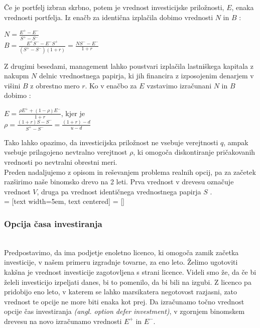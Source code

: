 Če je portfelj izbran skrbno, potem je vrednost investicijske priložnosti, $E$, enaka vrednosti portfelja. Iz enačb za identična izplačila dobimo vrednosti $N$ in $B$ \cite[str. 156]{Trigeorgis}:
\begin{center}
$N = \tfrac{E^+ - E^-}{S^+ - S^-}$\\[0,5 cm]
$B = \tfrac{E^+S^- - E^-S^+}{(S^+ - S^-)(1+r)} = \tfrac{NS^- - E^-}{1+r}$\\
\end{center}
Z drugimi besedami, management lahko poustvari izplačila lastniškega kapitala z nakupm $N$ delnic vrednostnega papirja, ki jih financira z izposojenim denarjem v višini $B$ z obrestno mero $r$. Ko v enačbo za $E$ vzstavimo izračunani $N$ in $B$ dobimo \cite[str. 156, 157]{Trigeorgis}:
\begin{center}
$E = \tfrac{\rho E^+ + (1-\rho)E^-}{1+r}$, kjer je \\[0,5 cm]
$\rho = \tfrac{(1+r)S - S^-}{S^+ - S^-} = \tfrac{(1+r)-d}{u-d}$
\end{center}
Tako lahko opazimo, da investicijska priložnost ne vsebuje verejtnosti $q$, ampak vsebuje prilagojeno nevtralno verejtnost $\rho$, ki omogoča diskontiranje pričakovanih vrednosti po nevtralni obrestni meri. \\

Preden nadaljujemo z opisom in reševanjem problema realnih opcij, pa za začetek razširimo naše binomsko drevo na 2 leti. Prva vrednost v drevesu označuje vrednost $V$, druga pa vrednost identičnega vrednostnega papirja $S$ \cite[str. 158]{Trigeorgis}. \\[0,5 cm]

 = [text width=5em, text centered]
 = []

\subsubsection{Opcija časa investiranja}
\cite[str. 158, 161]{Trigeorgis}\\
Predpostavimo, da ima podjetje enoletno licenco, ki omogoča zamik začetka investicije, v našem primeru izgradnje tovarne, za eno leto. Želimo ugotoviti kakšna je vrednost investicije zagotovljena s strani licence. Videli smo že, da če bi želeli investicijo izpeljati danes, bi to pomenilo, da bi bili na izgubi. Z licenco pa pridobijo eno leto, v katerem se lahko marsikatera negotovost razjasni, zato vrednost te opcije ne more biti enaka kot prej. Da izračunamo točno vrednost opcije čas investiranja \textit{(angl. option defer investment)}, v zgornjem binomskem drevesu na novo izračunamo vrednosti $E^+$ in $E^-$. 


